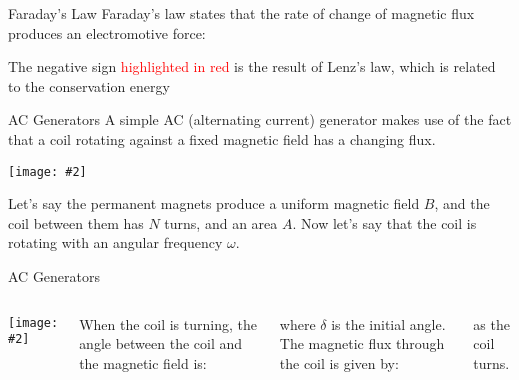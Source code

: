 \documentclass[12pt,aspectratio=169]{beamer}
\newcommand{\pic}[2]{\texttt{[image: \#2]}}
\newcommand{\eq}[2]{\vspace{#1}{\Large\begin{displaymath}#2\end{displaymath}}}
\begin{document}
\begin{frame}{Faraday's Law}
  Faraday's law states that the rate of change of magnetic flux produces an
  electromotive force:

  \eq{-.2in}{
    \boxed{
      \mathcal{E}=\oint\bm{E}\cdot\dl\bm{l}={\color{red}{-}}
      \diff{\Phi}t
    }
  }
  
  The negative sign {\textcolor{red}{highlighted in red}} is the result of
  Lenz's law, which is related to the conservation energy
\end{frame}



\begin{frame}{AC Generators}
  A simple AC (alternating current) generator makes use of the fact that a 
  coil rotating against a fixed magnetic field has a changing flux.
  \begin{center}
    \pic{.45}{generator}
  \end{center}
  Let's say the permanent magnets produce a uniform magnetic field $B$, and the
  coil between them has $N$ turns, and an area $A$. Now let's say that the coil
  is rotating with an angular frequency $\omega$.
\end{frame}



\begin{frame}{AC Generators}
  \begin{columns}
    \pic{1}{generator}

    When the coil is turning, the angle between the coil and the magnetic field
    is:
    
    \eq{-.2in}{
      \theta=\omega t+\delta
    } 

    \vspace{-.1in}where $\delta$ is the initial angle. The magnetic flux
    through the coil is given by:
    
    \vspace{-.4in}{\Large
      \begin{align*}
        \Phi&=NBA\cos\theta\\
        &=NBA\cos(\omega t+\delta)
      \end{align*}
    }
    
    \vspace{-.3in}as the coil turns.
  \end{columns}
\end{frame}
\end{document}
